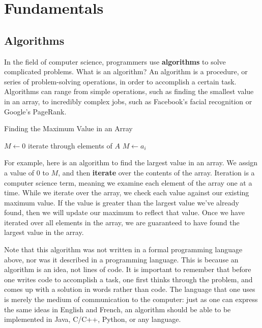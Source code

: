 \chapter{Fundamentals}

\section{Algorithms}

In the field of computer science, programmers use \textbf{algorithms} to solve complicated problems. What is an algorithm? An algorithm is a procedure, or series of problem-solving operations, in order to accomplish a certain task. Algorithms can range from simple operations, such as finding the smallest value in an array, to incredibly complex jobs, such as Facebook's facial recognition or Google's PageRank.

\begin{algorithm}
\caption{Finding the Maximum Value in an Array}
\begin{algorithmic}
\State $M \gets 0$
 \Comment iterate through elements of $A$
        $M \gets a_i$
    \EndIf
\EndFor
\end{algorithmic}
\end{algorithm}

For example, here is an algorithm to find the largest value in an array.  We assign a value of $ 0 $ to $ M $, and then \textbf{iterate} over the contents of the array. Iteration is a computer science term, meaning we examine each element of the array one at a time. While we iterate over the array, we check each value against our existing maximum value.  If the value is greater than the largest value we've already found, then we will update our maximum to reflect that value.  Once we have iterated over all elements in the array, we are guaranteed to have found the largest value in the array.

Note that this algorithm was not written in a formal programming language above, nor was it described in a programming language.  This is because an algorithm is an idea, not lines of code.  It is important to remember that before one writes code to accomplish a task, one first thinks through the problem, and comes up with a solution in words rather than code.  The language that one uses is merely the medium of communication to the computer: just as one can express the same ideas in English and French, an algorithm should be able to be implemented in Java, C/C++, Python, or any language.

